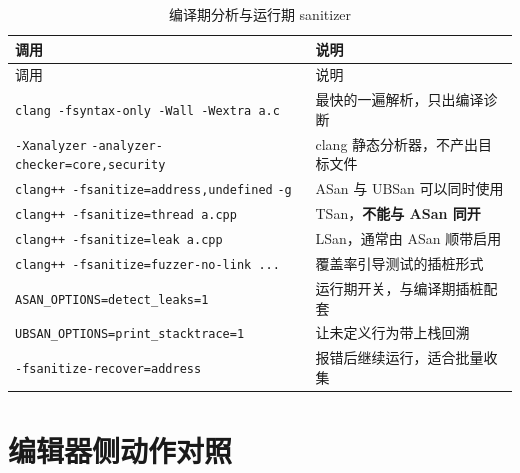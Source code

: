 \documentclass[12pt,a4paper,fontset=fandol]{ctexbook}
\begin{document}
{\footnotesize
\begin{longtable}{@{}>{\raggedright\arraybackslash}p{}
                  >{\raggedright\arraybackslash}p{}@{}}
\caption{编译期分析与运行期 sanitizer}\label{tab:appB-san}\\
\toprule
调用 & 说明 \\
\midrule
\endfirsthead
\toprule
调用 & 说明 \\
\midrule
\endhead
\bottomrule
\endlastfoot
\texttt{clang -fsyntax-only -Wall -Wextra a.c} & 最快的一遍解析，只出编译诊断 \\
\texttt{-Xanalyzer} \texttt{-analyzer-\allowbreak checker=core,security} & clang 静态分析器，不产出目标文件 \\
\texttt{clang++ -fsanitize=address,undefined} \texttt{-g} & ASan 与 UBSan 可以同时使用 \\
\texttt{clang++ -fsanitize=thread a.cpp} & TSan，\textbf{不能与 ASan 同开} \\
\texttt{clang++ -fsanitize=leak a.cpp} & LSan，通常由 ASan 顺带启用 \\
\texttt{clang++ -fsanitize=fuzzer-no-link ...} & 覆盖率引导测试的插桩形式 \\
\texttt{ASAN\_OPTIONS=detect\_leaks=1} & 运行期开关，与编译期插桩配套 \\
\texttt{UBSAN\_OPTIONS=\allowbreak print\_stacktrace=1} & 让未定义行为带上栈回溯 \\
\texttt{-fsanitize-recover=address} & 报错后继续运行，适合批量收集 \\
\end{longtable}
}

\section{编辑器侧动作对照}\label{sec:appB-s8}
\end{document}
